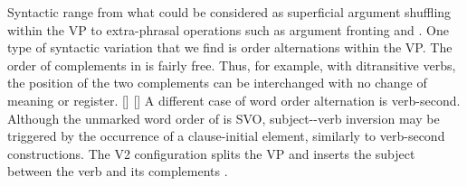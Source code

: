 \documentclass[output=paper]{langsci/langscibook}
\begin{document}
Syntactic\ili{} \ili{}\isi{}\ili{} range\ili{} from\ili{} what\ili{} could\ili{} be\ili{} considered\ili{} as\ili{} superficial\ili{} argument\ili{} shuffling\ili{} within\ili{} the\ili{} VP\ili{} to\ili{} extra\ili{}-phrasal\ili{} operations\ili{} such\ili{} as\ili{} argument\ili{} fronting\ili{} and\ili{} \ili{}\isi{}\ili{}.\ili{} One\ili{} type\ili{} of\ili{} syntactic\ili{} variation\ili{} that\ili{} we\ili{} find\ili{} is\ili{} order\ili{} alternations\ili{} within\ili{} the\ili{} VP\ili{}.\ili{} The\ili{} order\ili{} of\ili{} complements\ili{} in\ili{} \ili{}\ili{}\ili{} is\ili{} fairly\ili{} free\ili{}.\ili{} Thus\ili{},\ili{} for\ili{} example\ili{},\ili{} with\ili{} ditransitive\ili{} verbs\ili{},\ili{} the\ili{} position\ili{} of\ili{} the\ili{} two\ili{} complements\ili{} can\ili{} be\ili{} interchanged\ili{} with\ili{} no\ili{} change\ili{} of\ili{} meaning\ili{} or\ili{} register\ili{}.\ili{}
\ili{}
\ili{}\eal\ili{}
\ili{} \ili{} \ili{} \ili{} \ili{}\ex\ili{}[\ili{}]\ili{}
\ili{} \ili{} \ili{} \ili{} \ili{}\ex\ili{}[\ili{}]\ili{}
\ili{}\zl\ili{}
\ili{}
A\ili{} different\ili{} case\ili{} of\ili{} word\ili{} order\ili{} alternation\ili{} is\ili{} verb\ili{}-second\ili{}.\ili{} Although\ili{} the\ili{} unmarked\ili{} word\ili{} order\ili{} of\ili{} \ili{}\ili{}\ili{} is\ili{} SVO\ili{},\ili{} subject\ili{}-\ili{}-verb\ili{} inversion\ili{} may\ili{} be\ili{} triggered\ili{} by\ili{} the\ili{} occurrence\ili{} of\ili{} a\ili{} clause\ili{}-initial\ili{} element\ili{},\ili{} similarly\ili{} to\ili{} verb\ili{}-second\ili{} constructions\ili{}.\ili{} The\ili{} V2\ili{} configuration\ili{} splits\ili{} the\ili{} VP\ili{} and\ili{} inserts\ili{} the\ili{} subject\ili{} between\ili{} the\ili{} verb\ili{} and\ili{} its\ili{} complements\ili{} \ili{}\ili{}.\ili{}
\end{document}
